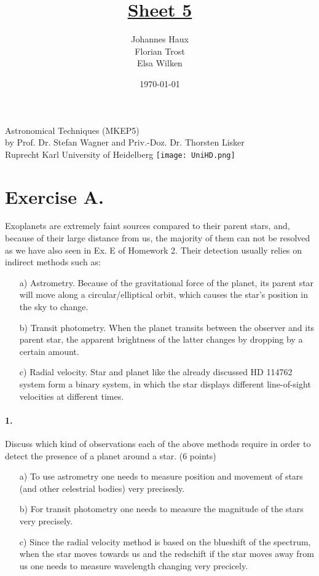\documentclass[11pt,a4paper,twoside]{article}
\title{\LARGE \underline {Sheet 5}}
\author{Johannes Haux \\ Florian Trost \\ Elsa Wilken}
\date{\today}
\begin{document}
\maketitle
\thispagestyle{empty}

\begin{center}
  Astronomical Techniques (MKEP5) \\
  \baselineskip35pt
  by Prof. Dr. Stefan Wagner and Priv.-Doz. Dr. Thorsten Lisker \\
  \baselineskip60pt
  Ruprecht Karl University of Heidelberg
\vskip 40pt
\texttt{[image: UniHD.png]}

\end{center}

\newpage
\setcounter{page}{1}		%

\section*{Exercise A.}
Exoplanets are extremely faint sources compared to their parent stars, and,
because of their large distance from us, the majority of them can not be resolved as we have also seen in Ex. E of Homework 2. Their detection usually relies on indirect methods
such as:\\
\begin{itemize}
	\item[a)]  Astrometry. Because of the gravitational force of the planet, its parent star will move along a circular/elliptical orbit, which causes the star's position in the sky to change.\\
	\item[b)] Transit photometry. When the planet transits between the observer and its parent star, the apparent brightness of the latter changes by dropping by a certain amount.\\
	\item[c)] Radial velocity. Star and planet like the already discussed HD 114762 system form a binary system, in which the star displays different line-of-sight velocities at different times.
\end{itemize}
\paragraph{1.} 
Discuss which kind of observations each of the above methods require in order to detect
the presence of a planet around a star. (6 points)\\
\begin{itemize}
	\item [a)] To use astrometry one needs to measure position and movement of stars (and other celestrial bodies) very precisesly.  
	\item [b)] For transit photometry one needs to measure the magnitude of the stars very precisely.
	\item [c)] Since the radial velocity method is based on the blueshift of the spectrum, when the star moves towards us and the redschift if the star moves away from us one needs to measure wavelength changing very precicely.

\end{itemize}
\end{document}
